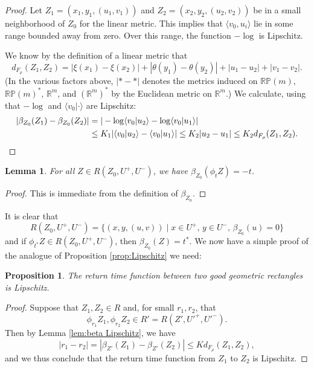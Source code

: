 \documentclass[JEP,XML,SOM,Unicode,NoFloatCountersInSection]{cedram}
\let\sep\mid
\newtheorem{lem}[thm]{Lemma}
\newtheorem{prop}[thm]{Proposition}
\theoremstyle{definition}
\numberwithin{equation}{section}
\begin{document}
\begin{proof}
Let $Z_1=(x_1,y_1,(u_1,v_1))$ and $Z_2=(x_2,y_2,(u_2,v_2))$ be in a small neighborhood of $Z_0$ for the linear metric. This implies that $\langle v_0,u_i\rangle$ lie in some range bounded away from zero. Over this range, the function $-\log$ is Lipschitz.

We know by the definition of a linear metric that\vspace*{-3pt}\enlargethispage{\baselineskip}%
\[ d_{F_\rho}(Z_1,Z_2) = |\xi(x_1)-\xi(x_2)| + |\theta(y_1)-\theta(y_2)| + |u_1-u_2| + |v_1-v_2|. \]
(In the various factors above, $|* - *|$ denotes the metrics induced on $\mathbb{RP}(m)$, $\mathbb{RP}(m)^*$, $\mathbb{R}^m$, and $(\mathbb{R}^m)^*$ by the Euclidean metric on $\mathbb{R}^m$.)
We calculate, using that $-\log$ and $\langle v_0 | \cdot\rangle$ are Lipschitz:\vspace*{-3pt}
\begin{align*}
|\beta_{Z_0}(Z_1)-\beta_{Z_0}(Z_2)| &= |-\log\langle v_0|u_2\rangle - \log\langle v_0|u_1\rangle |\\
& \leq K_1 |\langle v_0|u_2 \rangle - \langle v_0|u_1 \rangle| 
 \leq K_2 |u_2-u_1| \leq K_2 d_{F_\rho}(Z_1,Z_2). \qedhere
\end{align*}
\end{proof}

\begin{lem}
For all $Z\in R(Z_0,U^+,U^-)$, we have $\beta_{Z_0}(\phi_t Z) = -t$.
\end{lem}

\begin{proof}
This is immediate from the definition of $\beta_{Z_0}$.
\end{proof}

It is clear that\vspace*{-3pt}
\[
R(Z_0, U^+, U^-) = \{ (x,y,(u,v)) \sep x\in U^+,\, y\in U^-,\, \beta_{Z_0}(u)=0\}
\]
and if $\phi_{t^*}Z \in R(Z_0,U^+,U^-)$, then $\beta_{Z_0}(Z)=t^*$. We now have a simple proof of the analogue of Proposition \ref{prop:Lipschitz} we need:

\begin{prop}
The return time function between two good geometric rectangles is Lipschitz.
\end{prop}

\begin{proof}
Suppose that $Z_1, Z_2 \in R$ and, for small $r_1, r_2$, that\vspace*{-3pt}
\[
\phi_{r_1}Z_1, \phi_{r_2}Z_2 \in R'=R(Z',U'^+, U'^-).
\]
Then by Lemma \ref{lem:beta Lipschitz}, we have\vspace*{-4pt}
\[
|r_1-r_2| = |\beta_{Z'}(Z_1) - \beta_{Z'}(Z_2)| \leq K d_{F_\rho}(Z_1, Z_2),
\]
and we thus conclude that the return time function from $Z_1$ to $Z_2$ is Lipschitz.
\end{proof}
\end{document}
